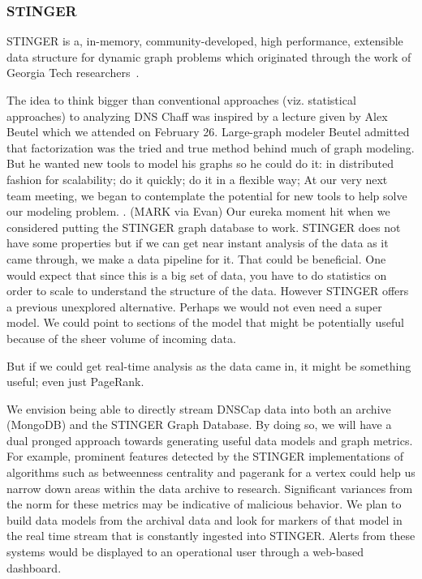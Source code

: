 \documentclass{acm_proc_article-sp}
\begin{document}
\subsubsection{STINGER}
STINGER is a, in-memory, community-developed, high performance, extensible data structure for dynamic graph problems which originated through the work of Georgia Tech researchers~\cite{STINGER}.

The idea to think bigger than conventional approaches (viz. statistical approaches) to analyzing DNS Chaff was inspired by a lecture given by Alex Beutel which we attended on February 26.\cite{LectureA} Large-graph modeler Beutel admitted that factorization was the tried and true method behind much of graph modeling.  But he wanted new tools to model his graphs so he could do it: 
in distributed fashion for scalability;
do it quickly;
do it in a flexible way;
At our very next team meeting, we began to contemplate the potential for new tools to help solve our modeling problem.
.
(MARK via Evan)
Our eureka moment hit when we considered putting the STINGER graph database to work.   STINGER does not have some properties but if we can get near instant analysis of the data as it came through, we make a data pipeline for it.  That could be beneficial.  One would expect that since this is a big set of data, you have to do statistics on order to scale to understand the structure of the data.  However STINGER offers a previous unexplored alternative.  Perhaps we would not even need a super model.  We could point to sections of the model that might be potentially useful because of the sheer volume of incoming data.

But if we could get real-time analysis as the data came in, it might be something useful; even just PageRank.


We envision being able to directly stream DNSCap data into both an archive (MongoDB) and the STINGER Graph Database. By doing so, we will have a dual pronged approach towards generating useful data models and graph metrics. For example, prominent features detected by the STINGER implementations of algorithms such as betweenness centrality and pagerank for a vertex could help us narrow down areas within the data archive to research. Significant variances from the norm for these metrics may be indicative of malicious behavior. We plan to build data models from the archival data and look for markers of that model in the real time stream that is constantly ingested into STINGER. Alerts from these systems would be displayed to an operational user through a web-based dashboard.
\end{document}
